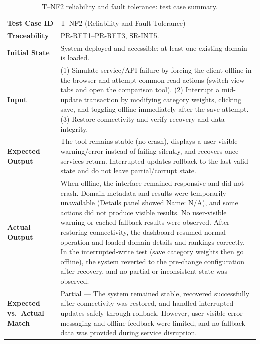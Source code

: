 \documentclass[12pt, titlepage]{article}
\begin{document}
\begin{table}[H]
  \centering
  \caption{T--NF2 reliability and fault tolerance: test case summary.}
  \label{tab:tnf2-summary}
  \begin{tabular}{@{}p{}p{}@{}}
    \toprule
    \textbf{Test Case ID} &
      T--NF2 (Reliability and Fault Tolerance) \\
    \textbf{Traceability} &
      PR-RFT1--PR-RFT3, SR-INT5. \\
    \textbf{Initial State} &
      System deployed and accessible; at least one existing domain is loaded. \\
    \textbf{Input} &
      (1) Simulate service/API failure by forcing the client offline in the
      browser and attempt common read actions (switch view tabs and open the
      comparison tool).  (2) Interrupt a mid-update transaction by modifying
      category weights, clicking save, and toggling offline immediately after
      the save attempt.  (3) Restore connectivity and verify recovery and data
      integrity. \\
    \textbf{Expected Output} &
      The tool remains stable (no crash), displays a user-visible warning/error
      instead of failing silently, and recovers once services return.
      Interrupted updates rollback to the last valid state and do not leave
      partial/corrupt state. \\
    \textbf{Actual Output} &
      When offline, the interface remained responsive and did not crash.
      Domain metadata and results were temporarily unavailable (Details panel
      showed Name: N/A), and some actions did not produce visible results.
      No user-visible warning or cached fallback results were observed.
      After restoring connectivity, the dashboard resumed normal operation and
      loaded domain details and rankings correctly.  In the interrupted-write
      test (save category weights then go offline), the system reverted to the
      pre-change configuration after recovery, and no partial or inconsistent
      state was observed. \\
    \textbf{Expected vs.\ Actual Match} &
      Partial --- The system remained stable, recovered successfully after
      connectivity was restored, and handled interrupted updates safely through
      rollback. However, user-visible error messaging and offline feedback were
      limited, and no fallback data was provided during service disruption. \\
    \bottomrule
  \end{tabular}
\end{table}
\end{document}
